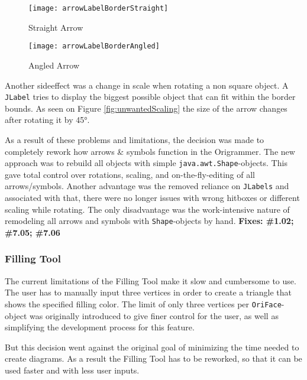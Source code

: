 \begin{figure*}[htbp]
	\centering
	\begin{subfigure}{0.3\textwidth}
		\texttt{[image: arrowLabelBorderStraight]}
		\caption{Straight Arrow}
		\label{fig:arrowLabelBorderStraight}
	\end{subfigure}
	\begin{subfigure}{0.3\textwidth}
		\texttt{[image: arrowLabelBorderAngled]}
		\caption{Angled Arrow}
		\label{fig:arrowLabelBorderAngled}
	\end{subfigure}
	\caption{Unwanted Scaling when Rotating\\ The wrong, always square hitbox, regardless of arrow shape}
	\label{fig:unwantedScaling}
\end{figure*}

\noindent Another sideeffect was a change in scale when rotating a non square object. A \texttt{JLabel} tries to display the biggest possible object that can fit within the border bounds. As seen on Figure \ref{fig:unwantedScaling} the size of the arrow changes after rotating it by 45°.

As a result of these problems and limitations, the decision was made to completely rework how arrows \& symbols function in the Origrammer. The new approach was to rebuild all objects with simple \texttt{java.awt.Shape}-objects. This gave total control over rotations, scaling, and on-the-fly-editing of all arrows/symbols. Another advantage was the removed reliance on \texttt{JLabels} and associated with that, there were no longer issues with wrong hitboxes or different scaling while rotating. The only disadvantage was the work-intensive nature of remodeling all arrows and symbols with \texttt{Shape}-objects by hand.
\newline
\textbf{Fixes: \#1.02; \#7.05; \#7.06}


\subsubsection{Filling Tool}

The current limitations of the Filling Tool make it slow and cumbersome to use. The user has to manually input three vertices in order to create a triangle that shows the specified filling color. The limit of only three vertices per \texttt{OriFace}-object was originally introduced to give finer control for the user, as well as simplifying the development process for this feature.

But this decision went against the original goal of minimizing the time needed to create diagrams. As a result the Filling Tool has to be reworked, so that it can be used faster and with less user inputs.

